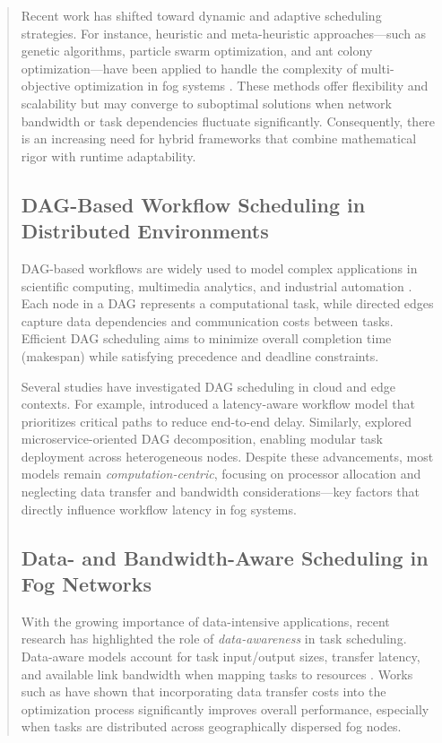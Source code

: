 \documentclass[conference]{IEEEtran}
\begin{document}
\begin{abstract}
Recent work has shifted toward dynamic and adaptive scheduling strategies. For instance, heuristic and meta-heuristic approaches—such as genetic algorithms, particle swarm optimization, and ant colony optimization—have been applied to handle the complexity of multi-objective optimization in fog systems \cite{kumar2023workload}. These methods offer flexibility and scalability but may converge to suboptimal solutions when network bandwidth or task dependencies fluctuate significantly. Consequently, there is an increasing need for hybrid frameworks that combine mathematical rigor with runtime adaptability.

\subsection{DAG-Based Workflow Scheduling in Distributed Environments}
DAG-based workflows are widely used to model complex applications in scientific computing, multimedia analytics, and industrial automation \cite{wang2021adaptive, rehman2018, cai2019}. Each node in a DAG represents a computational task, while directed edges capture data dependencies and communication costs between tasks. Efficient DAG scheduling aims to minimize overall completion time (makespan) while satisfying precedence and deadline constraints.

Several studies have investigated DAG scheduling in cloud and edge contexts. For example, \cite{salehi2016robust} introduced a latency-aware workflow model that prioritizes critical paths to reduce end-to-end delay. Similarly, \cite{dragoni2017microservices} explored microservice-oriented DAG decomposition, enabling modular task deployment across heterogeneous nodes. Despite these advancements, most models remain \textit{computation-centric}, focusing on processor allocation and neglecting data transfer and bandwidth considerations—key factors that directly influence workflow latency in fog systems.

\subsection{Data- and Bandwidth-Aware Scheduling in Fog Networks}
With the growing importance of data-intensive applications, recent research has highlighted the role of \textit{data-awareness} in task scheduling. Data-aware models account for task input/output sizes, transfer latency, and available link bandwidth when mapping tasks to resources \cite{mattia2023fogcontrol}. Works such as \cite{provisioning2023} have shown that incorporating data transfer costs into the optimization process significantly improves overall performance, especially when tasks are distributed across geographically dispersed fog nodes.


\end{abstract}
\end{document}
